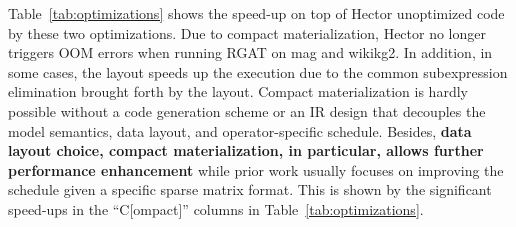 Table~\ref{tab:optimizations} shows the speed-up on top of Hector unoptimized code by these two optimizations. Due to compact materialization, Hector no longer triggers OOM errors when running RGAT on mag and wikikg2. In addition, in some cases, the layout speeds up the execution due to the common subexpression elimination brought forth by the layout. Compact materialization is hardly possible without a code generation scheme or an IR design that decouples the model semantics, data layout, and operator-specific schedule.
Besides, \textbf{data layout choice, compact materialization, in particular, allows further performance enhancement} while prior work usually focuses on improving the schedule given a specific sparse matrix format. This is shown by the significant speed-ups in the ``C[ompact]'' columns in Table~\ref{tab:optimizations}.



